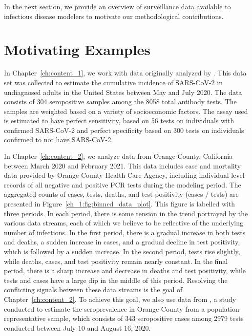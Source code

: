 In the next section, we provide an overview of surveillance data available to infectious disease modelers to motivate our methodological contributions.

\section{Motivating Examples}
\label{ch_1:sec:motivating_examples}

In Chapter~\ref{ch:content_1}, we work with data originally analyzed by \citet{Kali:2021}.
This data set was collected to estimate the cumulative incidence of SARS-CoV-2 in undiagnosed adults in the United States between May and July 2020.
The data consists of 304 seropositive samples among the 8058 total antibody tests.
The samples are weighted based on a variety of socioeconomic factors. 
 The assay used is estimated to have perfect sensitivity, based on 56 tests on individuals with confirmed SARS-CoV-2 and perfect specificity based on 300 tests on individuals confirmed to not have SARS-CoV-2.

In Chapter~\ref{ch:content_2}, we analyze data from Orange County, California between March 2020 and February 2021.
This data includes case and mortality data provided by Orange County Health Care Agency, including individual-level records of all negative and positive PCR tests during the modeling period.
The aggregated counts of cases, tests, deaths, and test-positivity (cases / tests) are presented in Figure~\ref{ch_1:fig:binned_data_plot}.
This figure is labelled with three periods.
In each period, there is some tension in the trend portrayed by the various data streams, each of which we believe to be reflective of the underlying number of infections.
In the first period, there is a gradual increase in both tests and deaths, a sudden increase in cases, and a gradual decline in test positivity, which is followed by a sudden increase.
In the second period, tests rise slightly, while deaths, cases, and test positivity remain nearly constant.
In the final period, there is a sharp increase and decrease in deaths and test positivity, while tests and cases have a large dip in the middle of this period.
Resolving the conflicting signals between these data streams is the goal of Chapter~\ref{ch:content_2}.
To achieve this goal, we also use data from \citet{Bruckner2021}, a study conducted to estimate the seroprevalence in Orange County from a population-representative sample, which consists of 343 seropositive cases among 2979 tests conducted between July 10 and August 16, 2020.

